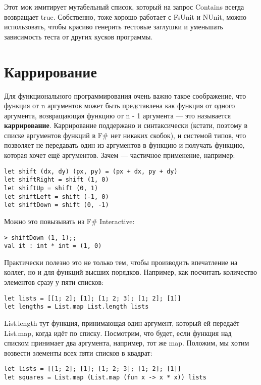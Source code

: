 \documentclass[a5paper]{article}
\begin{document}
Этот мок имитирует мутабельный список, который на запрос Contains всегда возвращает true. Собственно, тоже хорошо работает с FsUnit и NUnit, можно использовать, чтобы красиво генерить тестовые заглушки и уменьшать зависимость теста от других кусков программы.


\section{Каррирование}

Для функционального программирования очень важно такое соображение, что функция от n аргументов может быть представлена как функция от одного аргумента, возвращающая функцию от n - 1 аргумента --- это называется \textbf{каррирование}. Каррирование поддержано и синтаксически (кстати, поэтому в списке аргументов функций в F\# нет никаких скобок), и системой типов, что позволяет не передавать один из аргументов в функцию и получать функцию, которая хочет ещё аргументов. Зачем --- частичное применение, например:

\begin{verbatim}
let shift (dx, dy) (px, py) = (px + dx, py + dy)
let shiftRight = shift (1, 0)
let shiftUp = shift (0, 1)
let shiftLeft = shift (-1, 0)
let shiftDown = shift (0, -1)
\end{verbatim}

Можно это повызывать из F\# Interactive:

\begin{verbatim}
> shiftDown (1, 1);;
val it : int * int = (1, 0)
\end{verbatim}

Практически полезно это не только тем, чтобы производить впечатление на коллег, но и для функций высших порядков. Например, как посчитать количество элементов сразу у пяти списков:

\begin{verbatim}
let lists = [[1; 2]; [1]; [1; 2; 3]; [1; 2]; [1]]
let lengths = List.map List.length lists
\end{verbatim}

List.length тут функция, принимающая один аргумент, который ей передаёт List.map, когда идёт по списку. Посмотрим, что будет, если функция над списком принимает два аргумента, например, тот же map. Положим, мы хотим возвести элементы всех пяти списков в квадрат:

\begin{verbatim}
let lists = [[1; 2]; [1]; [1; 2; 3]; [1; 2]; [1]]
let squares = List.map (List.map (fun x -> x * x)) lists
\end{verbatim}
\end{document}
